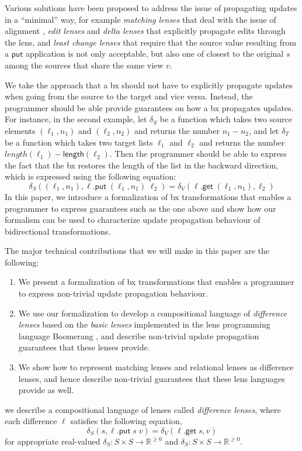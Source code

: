 \documentclass[acmsmall,review,anonymous]{acmart}\settopmatter{printfolios=true,printccs=false,printacmref=false}
\theoremstyle{definition}
\newcommand{\kw}[1]{\ensuremath{\mathsf{#1}}\xspace}
\newcommand{\get}{\ensuremath{\kw{get}}\xspace}
\newcommand{\pput}{\ensuremath{\kw{put}}\xspace}
\newcommand{\length}{\ensuremath{\kw{length}}\xspace}
\begin{document}
Various solutions have been proposed to address the issue of propagating updates in a ``minimal'' way, for example {\em matching lenses} that deal with the issue of alignment \cite{barbosa2010matching}, {\em edit lenses} \cite{hofmann2012edit} and {\em delta lenses} \cite{diskin2011asymmetric,diskin2011state,pacheco2012delta}
that explicitly propagate edits through the lens, and {\em least change
lenses} \cite{macedo2013composing} that require that the source value resulting from a \pput application is not only acceptable, but also one of closest to the original $s$ among the sources that share the same view $v$.

We take the approach that a bx should not have to explicitly propagate updates when going from the source to the target and vice versa. Instead, the programmer should be able provide guarantees on how a bx propagates updates. For instance, in the second example, let $\delta_S$ be a function which takes two source elements $(\ell_1, n_1)$ and $(\ell_2, n_2)$ and returns the number $n_1 - n_2$, and let $\delta_T$ be a function which takes two target lists $\ell_1$ and $\ell_2$ and returns the number $length(\ell_1) - \length(\ell_2)$. Then the programmer should be able to express the fact that the bx restores the length of the list in the backward direction, which is expressed using the following equation:
$$\delta_S((\ell_1, n_1), \ell.\pput \; (\ell_1, n_1) \; \ell_2) = \delta_V(\ell.\get \; (\ell_1, n_1), \ell_2) $$
In this paper, we introduce a formalization of bx transformations that enables a programmer to express guarantees such as the one above and show how our formalism can be used to characterize update propagation behaviour of bidirectional transformations.

The major technical contributions that we will make in this paper are the following:
\begin{enumerate}
  \item
  We present a formalization of bx transformations that enables a programmer to express non-trivial update propagation behaviour.
  \item
  We use our formalization to develop a compositional language of {\em difference lenses} based on the {\em basic lenses} implemented in the lens programming language Boomerang \cite{foster2009bidirectional}, and describe non-trivial update propagation guarantees that these lenses provide.
  \item
  We show how to represent matching lenses and  relational lenses \cite{bohannon2006relational} as difference lenses, and hence describe non-trivial guarantees that these lens languages provide as well.
\end{enumerate}
\iffalse
 we describe a compositional language of lenses called {\em difference lenses}, where each difference $\ell$ satisfies the following equation,
\begin{equation}\label{difflenslaw}
\delta_S(s, \ell.\pput \; s \; v) = \delta_V(\ell.\get \; s, v)
\end{equation}
for appropriate real-valued $\delta_S : S \times S \longrightarrow \mathbb{R}^{\geq 0}$ and $\delta_S : S \times S \longrightarrow \mathbb{R}^{\geq 0}$.
\end{document}
